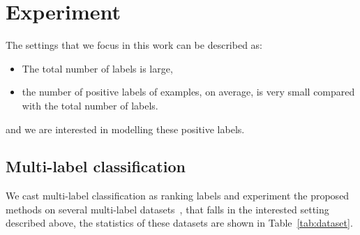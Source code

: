\section{Experiment}
\label{sec:experiment}

The settings that we focus in this work can be described as:
\begin{itemize}
\item The total number of labels is large,
\item the number of positive labels of examples, on average, is very small compared with the total number of labels.
\end{itemize}
and we are interested in modelling these positive labels.

\subsection{Multi-label classification}

We cast multi-label classification as ranking labels and experiment the proposed methods on several multi-label datasets~\cite{mulan2011}, 
that falls in the interested setting described above, the statistics of these datasets are shown in Table~\ref{tab:dataset}.

